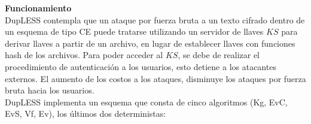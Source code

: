 \textbf{Funcionamiento}\\

DupLESS contempla que un ataque por fuerza bruta a un texto cifrado dentro de un esquema de tipo CE puede tratarse utilizando un servidor de llaves $KS$ para derivar llaves a partir de un archivo, en lugar de establecer llaves con funciones hash de los archivos. Para poder acceder al $KS$, se debe de realizar el procedimiento de autenticación a los usuarios, esto detiene a los atacantes externos. El aumento de los costos a los ataques, disminuye los ataques por fuerza bruta hacia los usuarios.\\


DupLESS implementa un esquema que consta de cinco algoritmos (Kg, EvC, EvS, Vf, Ev), los últimos dos deterministas: 


